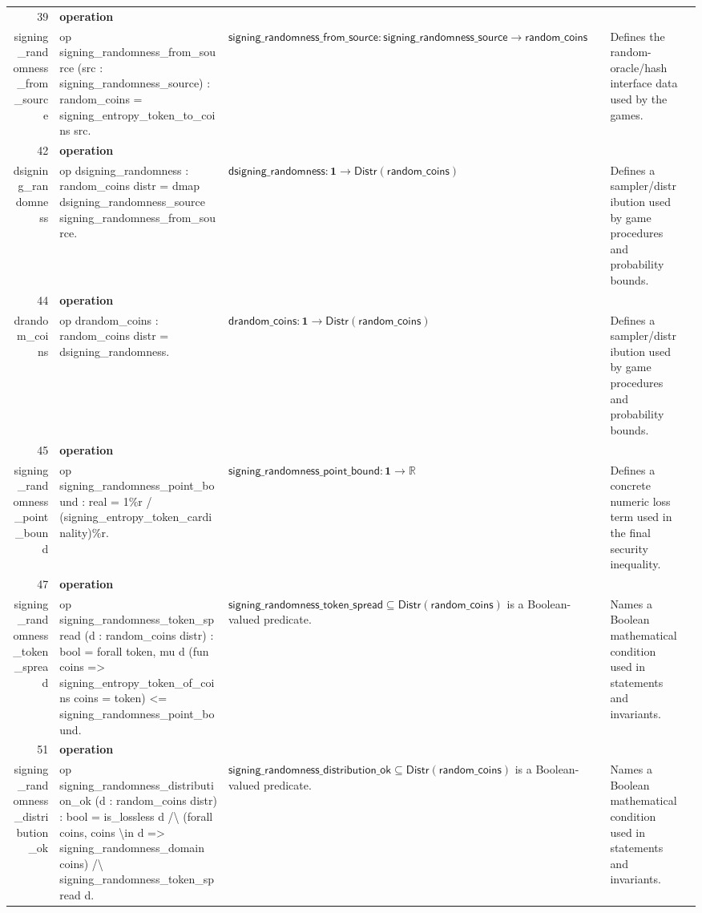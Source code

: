 \documentclass[10pt]{article}
\newcommand{\ec}[1]{\begingroup\ttfamily\scriptsize #1\endgroup}
\begin{document}
\begin{longtable}{r L{0.17\textwidth} L{0.26\textwidth} L{0.27\textwidth} L{0.20\textwidth}}
39 & \textbf{operation}\\\ec{signing\_randomness\_from\_source} & \ec{op signing\_randomness\_from\_source (src : signing\_randomness\_source) : random\_coins = signing\_entropy\_token\_to\_coins src.} & \(\mathsf{signing\_randomness\_from\_source} : \mathsf{signing\_randomness\_source} \to \mathsf{random\_coins}\) & Defines the random-oracle/hash interface data used by the games. \\
42 & \textbf{operation}\\\ec{dsigning\_randomness} & \ec{op dsigning\_randomness : random\_coins distr = dmap dsigning\_randomness\_source signing\_randomness\_from\_source.} & \(\mathsf{dsigning\_randomness} : \mathbf{1} \to \mathsf{Distr}(\mathsf{random\_coins})\) & Defines a sampler/distribution used by game procedures and probability bounds. \\
44 & \textbf{operation}\\\ec{drandom\_coins} & \ec{op drandom\_coins : random\_coins distr = dsigning\_randomness.} & \(\mathsf{drandom\_coins} : \mathbf{1} \to \mathsf{Distr}(\mathsf{random\_coins})\) & Defines a sampler/distribution used by game procedures and probability bounds. \\
45 & \textbf{operation}\\\ec{signing\_randomness\_point\_bound} & \ec{op signing\_randomness\_point\_bound : real = 1\%r / (signing\_entropy\_token\_cardinality)\%r.} & \(\mathsf{signing\_randomness\_point\_bound} : \mathbf{1} \to \mathbb{R}\) & Defines a concrete numeric loss term used in the final security inequality. \\
47 & \textbf{operation}\\\ec{signing\_randomness\_token\_spread} & \ec{op signing\_randomness\_token\_spread (d : random\_coins distr) : bool = forall token, mu d (fun coins => signing\_entropy\_token\_of\_coins coins = token) <= signing\_randomness\_point\_bound.} & \(\mathsf{signing\_randomness\_token\_spread} \subseteq \mathsf{Distr}(\mathsf{random\_coins})\) is a Boolean-valued predicate. & Names a Boolean mathematical condition used in statements and invariants. \\
51 & \textbf{operation}\\\ec{signing\_randomness\_distribution\_ok} & \ec{op signing\_randomness\_distribution\_ok (d : random\_coins distr) : bool = is\_lossless d /\textbackslash{} (forall coins, coins \textbackslash{}in d => signing\_randomness\_domain coins) /\textbackslash{} signing\_randomness\_token\_spread d.} & \(\mathsf{signing\_randomness\_distribution\_ok} \subseteq \mathsf{Distr}(\mathsf{random\_coins})\) is a Boolean-valued predicate. & Names a Boolean mathematical condition used in statements and invariants. \\

\end{longtable}
\end{document}
